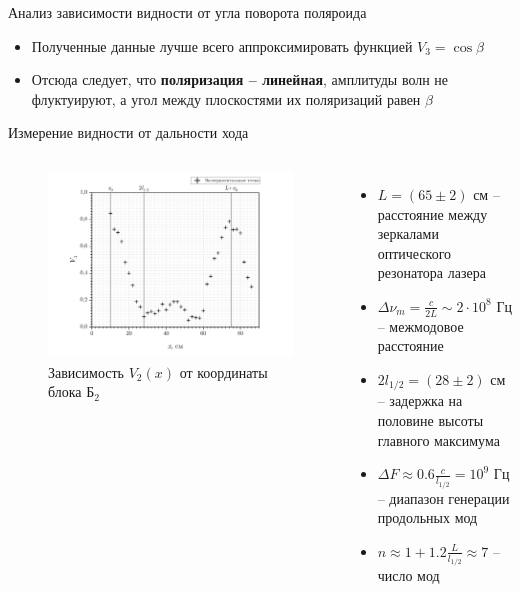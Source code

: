 \documentclass[11pt]{beamer} %
\begin{document}
    \begin{frame}{Анализ зависимости видности от угла поворота поляроида}
        \begin{itemize}
            \item Полученные данные лучше всего аппроксимировать функцией $V_3 = \cos \beta$
            \item Отсюда следует, что \textbf{поляризация -- линейная}, амплитуды волн не флуктуируют, а угол между плоскостями их поляризаций равен $\beta$
        \end{itemize}
    \end{frame}

    \begin{frame}{Измерение видности от дальности хода}
        \begin{columns}
            \begin{figure}[H]
            \centering
                \includegraphics[width = \textwidth]{images/v2_x.png}
                \caption{Зависимость $V_2(x)$ от координаты блока $\text{Б}_2$}
            \end{figure}

            \begin{itemize}
                \item $L = \left( 65 \pm 2 \right) \text{ см}$ -- расстояние между зеркалами оптического резонатора лазера
                \item $\Delta \nu_m = \frac{c}{2L} \sim 2 \cdot 10^8 \text{ Гц}$ -- межмодовое расстояние
                \item $2l_{1/2} = \left( 28 \pm 2 \right) \text{ см}$ -- задержка на половине высоты главного максимума
                \item $\Delta F \approx 0.6 \frac{c}{l_{1/2}} = 10^{9} \text{ Гц}$ -- диапазон генерации продольных мод
                \item $n \approx 1 + 1.2 \frac{L}{l_{1/2}} \approx 7$ -- число мод
            \end{itemize}
            
        \end{columns}
    \end{frame}
\end{document}
